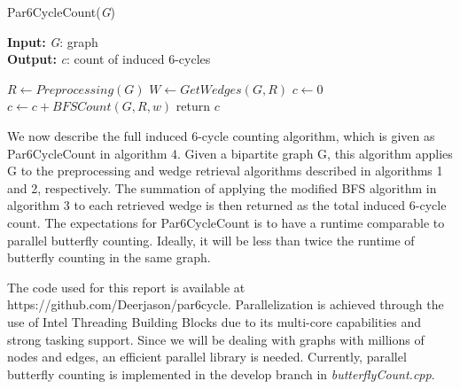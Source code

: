 \documentclass[11pt]{article}
\begin{document}
\begin{algorithm}[H]
\caption{Par6CycleCount(\textit{G})}
\hspace*{\algorithmicindent} \textbf{Input:} \textit{G}: graph \\
\hspace*{\algorithmicindent} \textbf{Output:} \textit{c}: count of induced 6-cycles
\begin{algorithmic}[1]
    \State $R \gets Preprocessing(G)$
    \State $W \gets GetWedges(G, R)$
    \State $c \gets $0
        \State $c \gets c + BFSCount(G, R, w)$
    \EndFor
    \State return $c$
\end{algorithmic}
\end{algorithm}

We now describe the full induced 6-cycle counting algorithm, which is given as Par6CycleCount in algorithm 4.
Given a bipartite graph G, this algorithm applies G to the preprocessing and wedge retrieval algorithms described in algorithms 1 and 2, respectively.
The summation of applying the modified BFS algorithm in algorithm 3 to each retrieved wedge is then returned as the total induced 6-cycle count.
The expectations for Par6CycleCount is to have a runtime comparable to parallel butterfly counting.
Ideally, it will be less than twice the runtime of butterfly counting in the same graph.

The code used for this report is available at https://github.com/Deerjason/par6cycle.
Parallelization is achieved through the use of Intel Threading Building Blocks due to its multi-core capabilities and strong tasking support.
Since we will be dealing with graphs with millions of nodes and edges, an efficient parallel library is needed.
Currently, parallel butterfly counting is implemented in the develop branch in \textit{butterflyCount.cpp}.

{}

\end{document}
